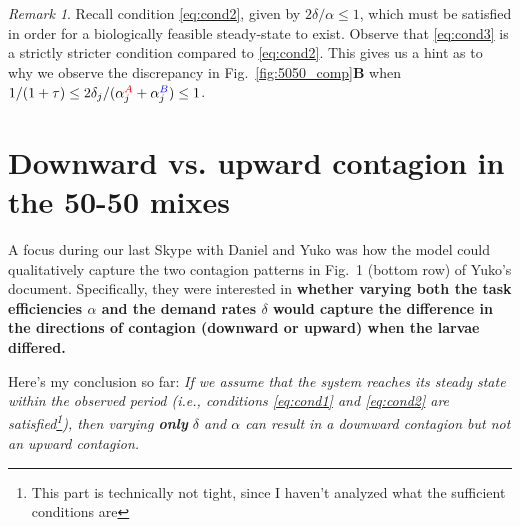 \documentclass[10pt]{article}
\theoremstyle{remark}
\newtheorem*{remark}{Remark}
\newcommand{\A}{{\color{red}A}}
\newcommand{\B}{{\color{blue}B}}
\begin{document}
\begin{remark}
Recall condition \eqref{eq:cond2}, given by $2\delta/\alpha \leq 1$, which must be satisfied in order for a biologically feasible steady-state to exist. 
Observe that \eqref{eq:cond3} is a strictly stricter condition compared to \eqref{eq:cond2}. This gives us a hint as to why we observe the discrepancy in Fig.~\ref{fig:5050_comp}\textbf{B} when $1/(1+\tau) \leq 2\delta_j/(\alpha_j^{\A}+\alpha_j^{\B}) \leq 1$.
\end{remark}


\newpage
\section{Downward vs. upward contagion in the 50-50 mixes} \label{sec:contagion}

A focus during our last Skype with Daniel and Yuko was how the model could qualitatively capture the two contagion patterns in Fig.~1 (bottom row) of Yuko's document. Specifically, they were interested in \textbf{whether varying both the task efficiencies $\alpha$ and the demand rates $\delta$ would capture the difference in the directions of contagion (downward or upward) when the larvae differed.}

Here's my conclusion so far: {\color{red}\textit{If we assume that the system reaches its steady state within the observed period (i.e., conditions \eqref{eq:cond1} and \eqref{eq:cond2} are satisfied\footnote{This part is technically not tight, since I haven't analyzed what the sufficient conditions are}), then varying \textbf{only} $\delta$ and $\alpha$ can result in a downward contagion but not an upward contagion.}}
\end{document}
